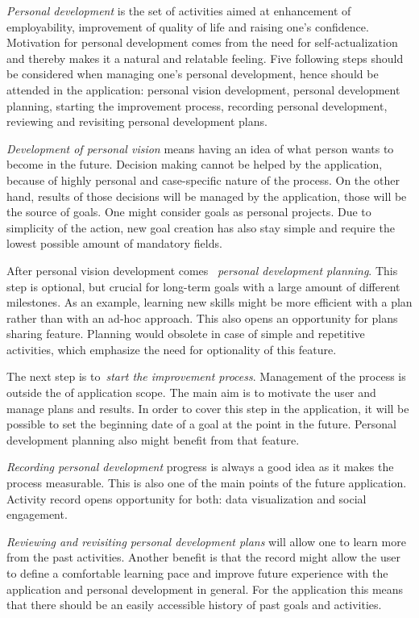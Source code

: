 \textit{Personal development} is the set of activities aimed at enhancement of employability, improvement of quality of life and raising one's confidence.\cite{what-is-personal-development}
Motivation for personal development comes from the need for self-actualization and thereby makes it a natural and relatable feeling.
Five following steps should be considered when managing one's personal development, hence should be attended in the application:
personal vision development, personal development planning, starting the improvement process, recording personal development, reviewing and revisiting personal development plans.

\textit{Development of personal vision} means having an idea of what person wants to become in the future.
Decision making cannot be helped by the application, because of highly personal and case-specific nature of the process.
On the other hand, results of those decisions will be managed by the application, those will be the source of goals.
One might consider goals as personal projects.
Due to simplicity of the action, new goal creation has also stay simple and require the lowest possible amount of mandatory fields.

After personal vision development comes ~\textit{personal development planning}.
This step is optional, but crucial for long-term goals with a large amount of different milestones.
As an example, learning new skills might be more efficient with a plan rather than with an ad-hoc approach.
This also opens an opportunity for plans sharing feature.
Planning would obsolete in case of simple and repetitive activities, which emphasize the need for optionality of this feature.

The next step is to~\textit{start the improvement process}.
Management of the process is outside the of application scope.
The main aim is to motivate the user and manage plans and results.
In order to cover this step in the application, it will be possible to set the beginning date of a goal at the point in the future.
Personal development planning also might benefit from that feature.

\textit{Recording personal development} progress is always a good idea as it makes the process measurable.
This is also one of the main points of the future application.
Activity record opens opportunity for both: data visualization and social engagement.

\textit{Reviewing and revisiting personal development plans} will allow one to learn more from the past activities.
Another benefit is that the record might allow the user to define a comfortable learning pace and improve future experience with the application and personal development in general.
For the application this means that there should be an easily accessible history of past goals and activities.

